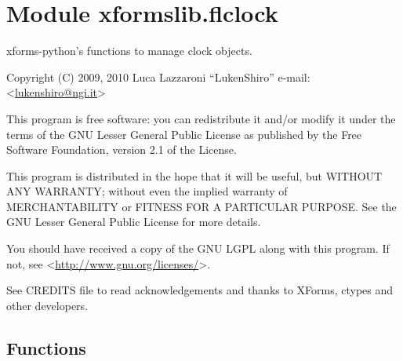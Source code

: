 %
%
%


\section{Module xformslib.flclock}

    \label{xformslib:flclock}

xforms-python's functions to manage clock objects.

Copyright (C) 2009, 2010  Luca Lazzaroni ``LukenShiro''
e-mail: <\href{mailto:lukenshiro@ngi.it}{lukenshiro@ngi.it}>

This program is free software: you can redistribute it and/or modify
it under the terms of the GNU Lesser General Public License as
published by the Free Software Foundation, version 2.1 of the License.

This program is distributed in the hope that it will be useful,
but WITHOUT ANY WARRANTY; without even the implied warranty of
MERCHANTABILITY or FITNESS FOR A PARTICULAR PURPOSE. See the
GNU Lesser General Public License for more details.

You should have received a copy of the GNU LGPL along with this
program. If not, see <\href{http://www.gnu.org/licenses/}{http://www.gnu.org/licenses/}>.

See CREDITS file to read acknowledgements and thanks to XForms,
ctypes and other developers.


  \subsection{Functions}

    \label{xformslib:flclock:fl_add_clock}

